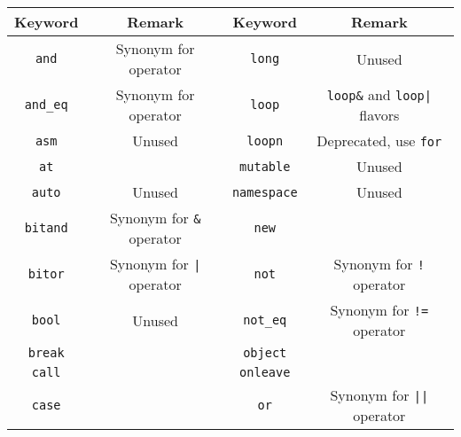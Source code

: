 \renewcommand{\baselinestretch}{.85}
\begin{table}[\floatpos]
  \centering
  \begin{tabular}{|c|c||c|c|}
    \hline
    Keyword                       & Remark                                  &
    Keyword                       & Remark                                  \\
    \hline
    \lstinline"and"               & Synonym for  operator                   &
    \lstinline"long"              & Unused                                  \\
    \lstinline"and_eq"            & Synonym for  operator                   &
    \lstinline"loop"              & \lstinline|loop&| and
                                    \lstinline-loop|- flavors               \\
    \lstinline"asm"               & Unused                                  &
    \lstinline"loopn"             & Deprecated, use \lstinline|for|         \\
    \lstinline"at"                &                                         &
    \lstinline"mutable"           & Unused                                  \\
    \lstinline"auto"              & Unused                                  &
    \lstinline"namespace"         & Unused                                  \\
    \lstinline"bitand"            & Synonym for \lstinline|&| operator      &
    \lstinline"new"               &                                         \\
    \lstinline"bitor"             & Synonym for \lstinline-|- operator      &
    \lstinline"not"               & Synonym for \lstinline|!| operator      \\
    \lstinline"bool"              & Unused                                  &
    \lstinline"not_eq"            & Synonym for \lstinline|!=| operator     \\
    \lstinline"break"             &                                         &
    \lstinline"object"            &                                         \\
    \lstinline"call"              &                                         &
    \lstinline"onleave"           &                                         \\
    \lstinline"case"              &                                         &
    \lstinline"or"                & Synonym for \lstinline-||- operator     \\

\end{tabular}
\end{table}
